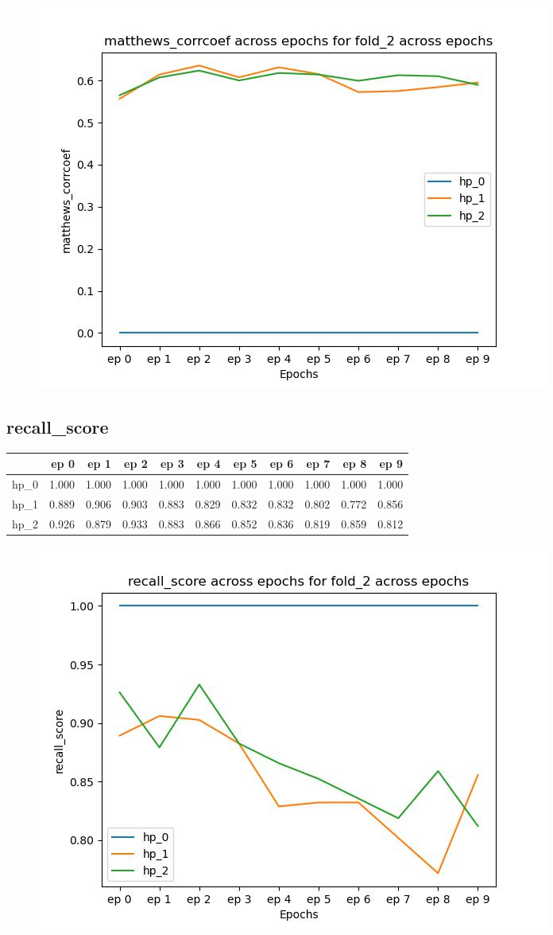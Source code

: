 \documentclass{article}
\begin{document}
\begin{figure}[H]
\includegraphics[scale = 0.75]{fold_2/matthews_corrcoef}
\end{figure}
\subsection{recall\_score}
\begin{tabular}{lrrrrrrrrrr}
\toprule
{} &   ep 0 &   ep 1 &   ep 2 &   ep 3 &   ep 4 &   ep 5 &   ep 6 &   ep 7 &   ep 8 &   ep 9 \\
\midrule
hp\_0 &  1.000 &  1.000 &  1.000 &  1.000 &  1.000 &  1.000 &  1.000 &  1.000 &  1.000 &  1.000 \\
hp\_1 &  0.889 &  0.906 &  0.903 &  0.883 &  0.829 &  0.832 &  0.832 &  0.802 &  0.772 &  0.856 \\
hp\_2 &  0.926 &  0.879 &  0.933 &  0.883 &  0.866 &  0.852 &  0.836 &  0.819 &  0.859 &  0.812 \\
\bottomrule
\end{tabular}

\begin{figure}[H]
\includegraphics[scale = 0.75]{fold_2/recall_score}
\end{figure}
\end{document}
